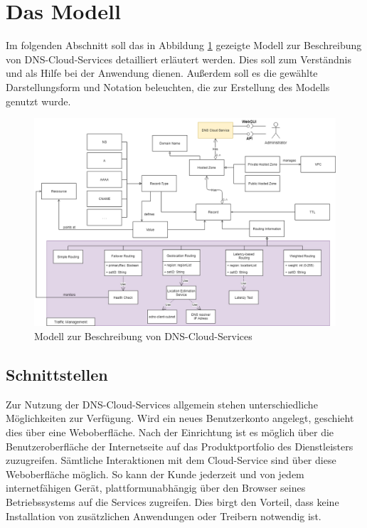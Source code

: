 \section{Das Modell}
Im folgenden Abschnitt soll das in Abbildung \ref{fig:ccmodel} gezeigte Modell zur Beschreibung von DNS-Cloud-Services detailliert erläutert werden. Dies soll zum Verständnis und als Hilfe bei der Anwendung dienen. Außerdem soll es die gewählte Darstellungsform und Notation beleuchten, die zur Erstellung des Modells genutzt wurde.

\begin{figure}
    \includegraphics[width=\textwidth]{images/cc_modelxml.png}
    \caption{Modell zur Beschreibung von DNS-Cloud-Services}
    \label{fig:ccmodel}
\end{figure}

\subsection{Schnittstellen}
Zur Nutzung der DNS-Cloud-Services allgemein stehen unterschiedliche Möglichkeiten zur Verfügung. Wird ein neues Benutzerkonto angelegt, geschieht dies über eine Weboberfläche. Nach der Einrichtung ist es möglich über die Benutzeroberfläche der Internetseite auf das Produktportfolio des Dienstleisters zuzugreifen. Sämtliche Interaktionen mit dem Cloud-Service sind über diese Weboberfläche möglich. So kann der Kunde jederzeit und von jedem internetfähigen Gerät, plattformunabhängig über den Browser seines Betriebssystems auf die Services zugreifen. Dies birgt den Vorteil, dass keine Installation von zusätzlichen Anwendungen oder Treibern notwendig ist.

